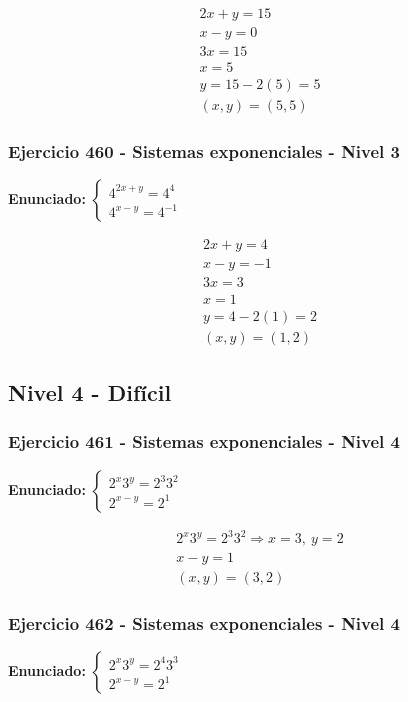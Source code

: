 \documentclass[12pt,a4paper]{article}
\begin{document}
\[
\begin{aligned}
2x+y=15\\
x-y=0\\
3x=15\\
x=5\\
y=15-2(5)=5\\
\boxed{(x,y)=(5,5)}
\end{aligned}
\]


\subsubsection*{Ejercicio 460 - Sistemas exponenciales - Nivel 3}
\textbf{Enunciado:} \(\begin{cases} 4^{2x+y}=4^{4}\\ 4^{x-y}=4^{-1}\end{cases}\)

\[
\begin{aligned}
2x+y=4\\
x-y=-1\\
3x=3\\
x=1\\
y=4-2(1)=2\\
\boxed{(x,y)=(1,2)}
\end{aligned}
\]


\newpage

\subsection*{Nivel 4 - Difícil}

\subsubsection*{Ejercicio 461 - Sistemas exponenciales - Nivel 4}
\textbf{Enunciado:} \(\begin{cases} 2^x3^y=2^{3}3^{2}\\ 2^{x-y}=2^{1}\end{cases}\)

\[
\begin{aligned}
2^x3^y=2^{3}3^{2}\Rightarrow x=3,\ y=2\\
x-y=1\\
\boxed{(x,y)=(3,2)}
\end{aligned}
\]


\subsubsection*{Ejercicio 462 - Sistemas exponenciales - Nivel 4}
\textbf{Enunciado:} \(\begin{cases} 2^x3^y=2^{4}3^{3}\\ 2^{x-y}=2^{1}\end{cases}\)
\end{document}

